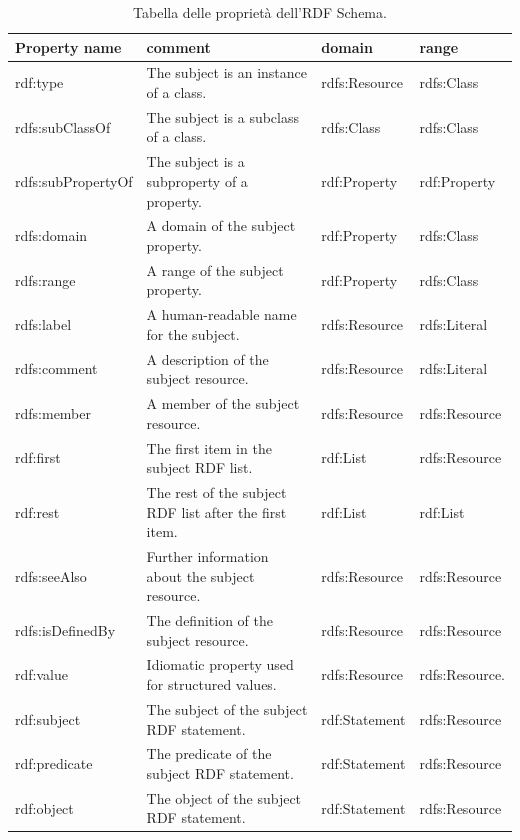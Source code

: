 \documentclass[a4paper,11pt]{article}
\begin{document}
\begin{enumerate}
\begin{enumerate}[label*=\arabic*.]
		\begin{table}[htb]
		\begin{center}			
		\begin{tabular}{|>{\small}l|>{\small}l|>{\small}l|>{\small}l|}
				\hline
			\textbf{Property name} & \textbf{comment}	& \textbf{domain} & \textbf{range}\\
				\hline
rdf:type & The subject is an instance of a class. & rdfs:Resource &	rdfs:Class\\
				\hline
rdfs:subClassOf	& The subject is a subclass of a class. & rdfs:Class &	rdfs:Class\\
				\hline
rdfs:subPropertyOf	& The subject is a subproperty of a property.&	rdf:Property & rdf:Property\\
				\hline
rdfs:domain & A domain of the subject property.& rdf:Property &	rdfs:Class\\
				\hline
rdfs:range & A range of the subject property.&	rdf:Property&rdfs:Class\\
				\hline
rdfs:label & A human-readable name for the subject. &	rdfs:Resource &	rdfs:Literal\\
				\hline
rdfs:comment& A description of the subject resource.& rdfs:Resource &	rdfs:Literal\\
				\hline
rdfs:member & A member of the subject resource. &	rdfs:Resource &	rdfs:Resource\\
				\hline
rdf:first & The first item in the subject RDF list. & rdf:List&	rdfs:Resource\\
				\hline
rdf:rest & The rest of the subject RDF list after the first item. & rdf:List & rdf:List\\
				\hline
rdfs:seeAlso & Further information about the subject resource. & rdfs:Resource & rdfs:Resource\\
				\hline
rdfs:isDefinedBy & The definition of the subject resource.	& rdfs:Resource & rdfs:Resource\\
				\hline
rdf:value &	Idiomatic property used for structured values.&	rdfs:Resource &	rdfs:Resource.\\
				\hline
rdf:subject	& The subject of the subject RDF statement. &	rdf:Statement &	rdfs:Resource\\
				\hline
rdf:predicate &	The predicate of the subject RDF statement. &	rdf:Statement &	rdfs:Resource\\
				\hline
rdf:object & The object of the subject RDF statement.&	rdf:Statement &	rdfs:Resource\\
				\hline		
		\end{tabular}
		\caption{Tabella delle proprietà dell'RDF Schema.}	
		\end{center}	
		\end{table}
		

\end{enumerate}
\end{enumerate}
\end{document}
